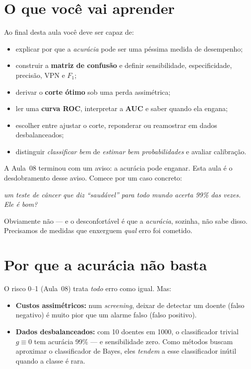 \documentclass[11pt,a4paper]{article}
\title{}
\date{}
\begin{document}

\section*{O que você vai aprender}
Ao final desta aula você deve ser capaz de:
\begin{itemize}[leftmargin=1.4cm]
  \item explicar por que a \emph{acurácia} pode ser uma péssima medida de
        desempenho;
  \item construir a \textbf{matriz de confusão} e definir sensibilidade,
        especificidade, precisão, VPN e $F_1$;
  \item derivar o \textbf{corte ótimo} sob uma perda assimétrica;
  \item ler uma \textbf{curva ROC}, interpretar a \textbf{AUC} e saber quando ela
        engana;
  \item escolher entre ajustar o corte, reponderar ou reamostrar em dados
        desbalanceados;
  \item distinguir \emph{classificar bem} de \emph{estimar bem probabilidades} e
        avaliar calibração.
\end{itemize}

\noindent
A Aula~08 terminou com um aviso: a acurácia pode enganar. Esta aula é o
desdobramento desse aviso. Comece por um caso concreto:

\begin{center}\itshape
  um teste de câncer que diz ``saudável'' para todo mundo acerta 99\% das vezes.\\
  Ele é bom?
\end{center}

\noindent
Obviamente não --- e o desconfortável é que a \emph{acurácia}, sozinha, não sabe
disso. Precisamos de medidas que enxerguem \emph{qual} erro foi cometido.

\section{Por que a acurácia não basta}
O risco 0--1 (Aula~08) trata \emph{todo} erro como igual. Mas:
\begin{itemize}[leftmargin=1.4cm,nosep]
  \item \textbf{Custos assimétricos:} num \emph{screening}, deixar de detectar um
        doente (falso negativo) é muito pior que um alarme falso (falso positivo).
  \item \textbf{Dados desbalanceados:} com 10 doentes em 1000, o classificador
        trivial $g\equiv 0$ tem acurácia 99\% --- e sensibilidade zero. Como
        métodos buscam aproximar o classificador de Bayes, eles \emph{tendem} a
        esse classificador inútil quando a classe é rara.
\end{itemize}
\end{document}
